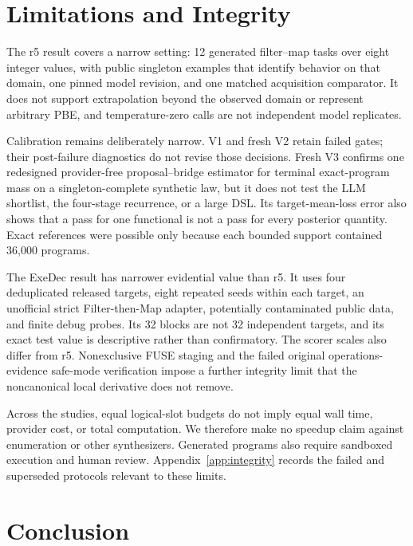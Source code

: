 \documentclass[twoside,11pt]{article}
\begin{document}
\section{Limitations and Integrity}
\label{sec:limitations}

The r5 result covers a narrow setting: 12 generated filter--map tasks over eight
integer values, with public singleton examples that identify behavior on that
domain, one pinned model revision, and one matched acquisition comparator. It
does not support extrapolation beyond the observed domain or represent
arbitrary PBE, and temperature-zero calls are not independent model replicates.

Calibration remains deliberately narrow. V1 and fresh V2 retain failed gates;
their post-failure diagnostics do not revise those decisions. Fresh V3 confirms
one redesigned provider-free proposal--bridge estimator for terminal
exact-program mass on a singleton-complete synthetic law, but it does not test
the LLM shortlist, the four-stage recurrence, or a large DSL. Its
target-mean-loss error also shows that a pass for one functional is not a pass
for every posterior quantity. Exact references were possible only because each
bounded support contained 36,000 programs.

The ExeDec result has narrower evidential value than r5. It uses four
deduplicated released targets, eight repeated seeds within each target, an
unofficial strict Filter-then-Map adapter, potentially contaminated public data,
and finite debug probes. Its 32 blocks are not 32 independent targets, and its
exact test value is descriptive rather than confirmatory. The scorer scales
also differ from r5. Nonexclusive FUSE staging and the failed original
operations-evidence safe-mode verification impose a further integrity limit
that the noncanonical local derivative does not remove.

Across the studies, equal logical-slot budgets do not imply equal wall time,
provider cost, or total computation. We therefore make no speedup claim against
enumeration or other synthesizers. Generated programs also require sandboxed
execution and human review. Appendix~\ref{app:integrity} records the failed and
superseded protocols relevant to these limits.

\section{Conclusion}
\label{sec:conclusion}
\end{document}
